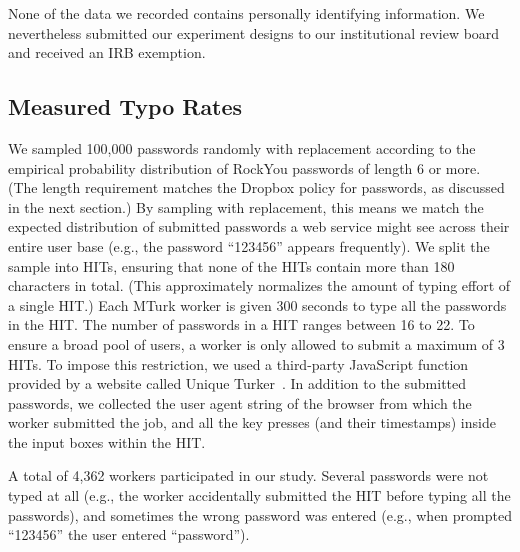 None of the data we recorded contains personally identifying information. We
nevertheless submitted our experiment designs to our institutional review board
and received an IRB exemption.


\subsection{Measured Typo Rates}

We sampled 100,000 passwords randomly with replacement
according to the empirical probability distribution of RockYou passwords of
length 6 or more.  (The
length requirement matches the Dropbox policy for passwords, as discussed in the
next section.) By sampling
with replacement, this means we match the expected distribution of
submitted passwords a web service might see across their entire user base 
(e.g., the password
``123456'' appears frequently).  We split the sample into HITs,
ensuring that none of the HITs contain more than 180 characters in
total. (This approximately normalizes the amount of typing effort of a
single HIT.)  %
Each
MTurk worker is given 300 seconds to type all the passwords in the
HIT. The number of passwords in a HIT ranges between 16 to 22.  To
ensure a broad pool of users, a worker is only allowed to submit a
maximum of 3 HITs. To impose this restriction, we used a third-party
JavaScript function provided by a website called Unique
Turker~\cite{uniqturker}.  In addition to the submitted passwords, we
collected the user agent string of the browser from which the worker
submitted the job, and all the key presses (and their timestamps)
inside the input boxes within the HIT.


A total of 4,362 workers participated in our study. Several passwords
were not typed at all (e.g., the worker accidentally submitted the HIT
before typing all the passwords), and sometimes the wrong password was
entered (e.g., when prompted ``123456'' the user entered
``password'').  %

